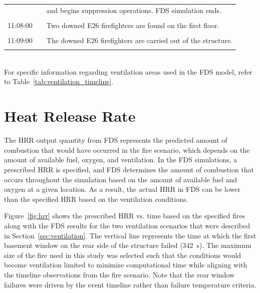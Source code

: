 \documentclass[12pt,oneside]{book}
\begin{document}
\begin{table}[!ht]
\begin{tabular}{ccl}
               &              &  and begins suppression operations. FDS simulation ends.             \\
               &              &                                                                      \\
11:08:00       &              &  Two downed E26 firefighters are found on the first floor.           \\
               &              &                                                                      \\
11:09:00       &              &  The downed E26 firefighters are carried out of the structure.       \\
               &              &                                                                      \\
\bottomrule
\end{tabular}
\footnotesize
\\ For specific information regarding ventilation areas used in the FDS model, refer to Table~\ref{tab:ventilation_timeline}.
\normalsize
\label{tab:combined_timeline}
\end{table}


\clearpage


\section{Heat Release Rate}
\label{sec:HRR}

The HRR output quantity from FDS represents the predicted amount of combustion that would have occurred in the fire scenario, which depends on the amount of available fuel, oxygen, and ventilation. In the FDS simulations, a prescribed HRR is specified, and FDS determines the amount of combustion that occurs throughout the simulation based on the amount of available fuel and oxygen at a given location. As a result, the actual HRR in FDS can be lower than the specified HRR based on the ventilation conditions.

Figure~\ref{fig:hrr} shows the prescribed HRR vs. time based on the specified fires along with the FDS results for the two ventilation scenarios that were described in Section~\ref{sec:ventilation}. The vertical line represents the time at which the first basement window on the rear side of the structure failed (342~s). The maximum size of the fire used in this study was selected such that the conditions would become ventilation limited to minimize computational time while aligning with the timeline observations from the fire scenario. Note that the rear window failures were driven by the event timeline rather than failure temperature criteria.
\end{document}
